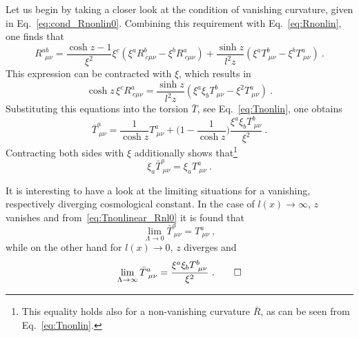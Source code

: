 \documentclass[11pt]{article}
\begin{document}
\blankline
Let us begin by taking a closer look at the condition of 
vanishing curvature, given in Eq.~\eqref{eq:cond_Rnonlin0}.  
Combining this requirement with Eq.~\eqref{eq:Rnonlin}, one finds 
that
\begin{displaymath}
	R^{ab}_{~~\mu\nu} = \frac{\cosh z - 1}{\xi^2} \xi^c (\xi^a 
	R^b_{~c\mu\nu} - \xi^b R^a_{~c\mu\nu}) + \frac{\sinh z}{l^2 z} 
	(\xi^a T^b_{~\mu\nu} - \xi^b T^a_{~\mu\nu})~.
\end{displaymath}
This expression can be contracted with $\xi$, which results in
\begin{equation}
	\cosh z\, \xi^c R^a_{~c\mu\nu} = \frac{\sinh z}{l^2 z} (\xi^a 
	\xi_b	T^b_{~\mu\nu} - \xi^2 T^a_{~\mu\nu})~.
\end{equation}
Substituting this equations into the torsion $\bar{T}$, see 
Eq.~\eqref{eq:Tnonlin}, one obtains
\begin{equation}
	\label{eq:Tnonlinear_Rnl0}
	\bar{T}^a_{~\mu\nu} = \frac{1}{\cosh z} T^a_{~\mu\nu} + 
	\bigg(1-\frac{1}{\cosh z}\bigg) \frac{\xi^a\xi_b 
		T^b_{~\mu\nu}}{\xi^2}~.
\end{equation}
Contracting both sides with $\xi$ additionally shows 
that\footnote{This equality holds also for a non-vanishing 
	curvature $\bar{R}$, as can be seen from 
	Eq.~\eqref{eq:Tnonlin}.}
\begin{displaymath}
	\xi_a \bar{T}^a_{~\mu\nu} = \xi_a T^a_{~\mu\nu}~.
\end{displaymath}
\begin{remark}
	It is interesting to have a look at the limiting situations 
	for a vanishing, respectively diverging cosmological constant.  
	In the case of $l(x) \to \infty$, $z$ vanishes and 
	from~\eqref{eq:Tnonlinear_Rnl0} it is found that
	\begin{displaymath}
		\lim_{\Lambda \to 0} \bar{T}^a_{~\mu\nu} = T^a_{~\mu\nu}~,
	\end{displaymath}
	while on the other hand for $l(x) \to 0$, $z$ diverges and
	\begin{displaymath}
		\lim_{\Lambda \to \infty} \bar{T}^a_{~\mu\nu} = 
		\frac{\xi^a\xi_b T^b_{~\mu\nu}}{\xi^2}~.
		\qedhere
	\end{displaymath}
\end{remark}
\end{document}
